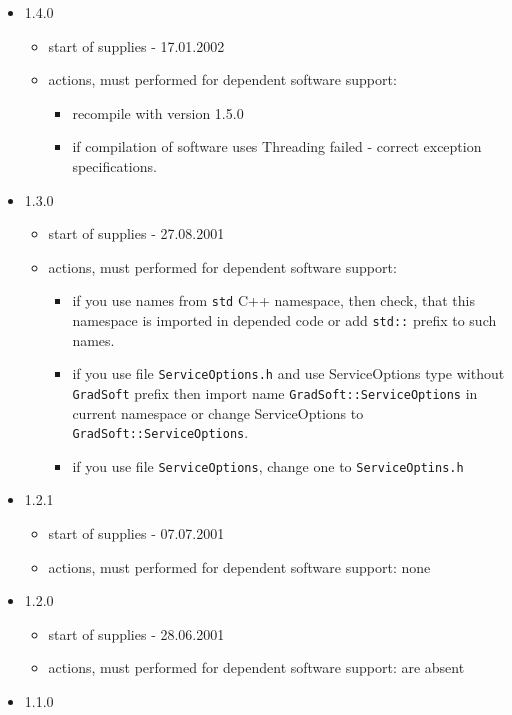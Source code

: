 \documentclass[10pt]{article}
\begin{document}
\begin{itemize}
\begin{itemize}
  \end{itemize}
  \item 1.4.0
  \begin{itemize}
   \item start of supplies - 17.01.2002
   \item actions, must performed for dependent software support:
   \begin{itemize}
     \item recompile with version 1.5.0
     \item if compilation of software uses Threading failed - correct exception specifications.
   \end{itemize}
  \end{itemize}
  \item 1.3.0
  \begin{itemize}
   \item start of supplies - 27.08.2001
   \item actions, must performed for dependent software support:
   \begin{itemize}
     \item if you use names from \verb|std| C++ namespace, then check,
      that this namespace is imported in depended code or add \verb|std::|
      prefix to such names.
     \item if you use file \verb|ServiceOptions.h| and use ServiceOptions type 
      without \verb|GradSoft| prefix then import name 
      \verb|GradSoft::ServiceOptions| in current namespace or change
      ServiceOptions to \verb|GradSoft::ServiceOptions|.
     \item if you use file \verb|ServiceOptions|, change one to 
         \verb|ServiceOptins.h|
   \end{itemize}
  \end{itemize}
  \item 1.2.1
  \begin{itemize}
   \item start of supplies - 07.07.2001
   \item actions, must performed for dependent software support: none
  \end{itemize}
  \item 1.2.0
  \begin{itemize}
   \item start of supplies - 28.06.2001
   \item actions, must performed for dependent software support: are absent
  \end{itemize}
  \item 1.1.0

\end{itemize}
\end{document}
